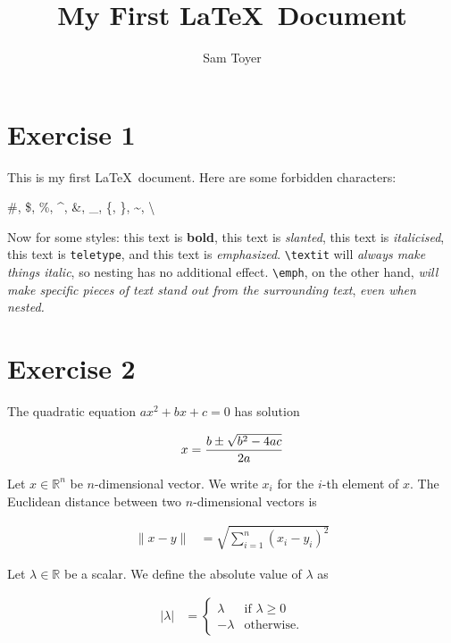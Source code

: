 \documentclass[10pt,a4paper]{article}
\begin{document}
\title{My First \LaTeX~Document}
\author{Sam Toyer}
\maketitle

\section*{Exercise 1}
    This is my first \LaTeX~document. Here are some forbidden characters:

    \begin{center}
        \#, \$, \%, \^{}, \&, \_, \{, \}, \~{}, \textbackslash
    \end{center}

    Now for some styles: this text is \textbf{bold}, this text is
    \textsl{slanted}, this text is \textit{italicised}, this text is
    \texttt{teletype}, and this text is \emph{emphasized}.
    \texttt{\textbackslash textit} will \textit{always make things
    \textit{italic}}, so nesting has no additional effect.
    \texttt{\textbackslash emph}, on the other hand, \emph{will make specific
    pieces of text \emph{stand out} from the surrounding text}, \emph{even
    \emph{when \emph{nested.}}}

\section*{Exercise 2}
    The quadratic equation $ax^2 + bx + c = 0$ has solution

    \[
        x = \frac{\-b \pm \sqrt{b^2 - 4ac}}{2a}
    \]

    Let $x \in \mathbb{R}^n$ be $n$-dimensional vector. We write $x_i$ for the
    $i$-th element of $x$. The Euclidean distance between two $n$-dimensional
    vectors is

    \begin{align}
        \|x - y\| &= \sqrt{ \sum_{i=1}^{n} (x_i - y_i)^2 }
    \end{align}

    Let $\lambda \in \mathbb{R}$ be a scalar. We define the absolute value of
    $\lambda$ as

    \begin{align}
        \left| \lambda \right| &=
        \begin{cases}
            \lambda & \text{if $\lambda \geq 0$} \\
            -\lambda & \text{otherwise}.
        \end{cases}
    \end{align}
\end{document}
